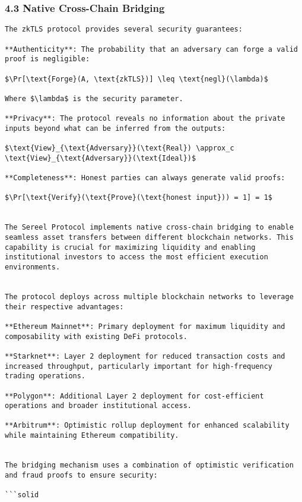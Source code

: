 \documentclass[12pt]{article}
\begin{document}
\subsubsection{4.3 Native Cross-Chain Bridging} %

\begin{lstlisting}
The zkTLS protocol provides several security guarantees:

**Authenticity**: The probability that an adversary can forge a valid proof is negligible:

$\Pr[\text{Forge}(A, \text{zkTLS})] \leq \text{negl}(\lambda)$

Where $\lambda$ is the security parameter.

**Privacy**: The protocol reveals no information about the private inputs beyond what can be inferred from the outputs:

$\text{View}_{\text{Adversary}}(\text{Real}) \approx_c \text{View}_{\text{Adversary}}(\text{Ideal})$

**Completeness**: Honest parties can always generate valid proofs:

$\Pr[\text{Verify}(\text{Prove}(\text{honest input})) = 1] = 1$


The Sereel Protocol implements native cross-chain bridging to enable seamless asset transfers between different blockchain networks. This capability is crucial for maximizing liquidity and enabling institutional investors to access the most efficient execution environments.


The protocol deploys across multiple blockchain networks to leverage their respective advantages:

**Ethereum Mainnet**: Primary deployment for maximum liquidity and composability with existing DeFi protocols.

**Starknet**: Layer 2 deployment for reduced transaction costs and increased throughput, particularly important for high-frequency trading operations.

**Polygon**: Additional Layer 2 deployment for cost-efficient operations and broader institutional access.

**Arbitrum**: Optimistic rollup deployment for enhanced scalability while maintaining Ethereum compatibility.


The bridging mechanism uses a combination of optimistic verification and fraud proofs to ensure security:

```solid
\end{lstlisting}
\end{document}
